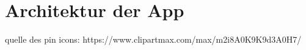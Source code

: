 \chapter{Architektur der App}

quelle des pin icons: https://www.clipartmax.com/max/m2i8A0K9K9d3A0H7/